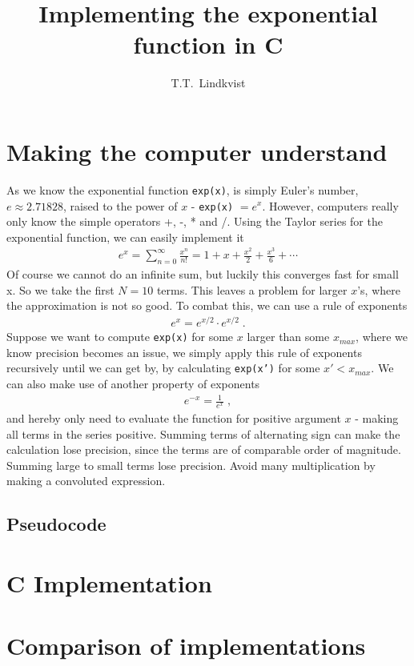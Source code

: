 \documentclass{article}
\title{Implementing the exponential function in C}
\author{T.T.~Lindkvist}
\date{}
\begin{document}
    \maketitle
    \section{Making the computer understand}
    As we know the exponential function \texttt{exp(x)}, is simply Euler's number, $e\approx2.71828$, raised to the power of $x$ - \texttt{exp(x)} $=e^x$. However, computers really only know the simple operators +, -, * and /. Using the Taylor series for the exponential function, we can easily implement it
    \begin{align}
        e^x = \sum_{n=0}^{\infty} \frac{x^n}{n!} = 1 + x + \frac{x^2}{2} + \frac{x^3}{6} + \cdots
    \end{align}
	Of course we cannot do an infinite sum, but luckily this converges fast for small x. So we take the first $N=10$ terms. This leaves a problem for larger $x$'s, where the approximation is not so good. To combat this, we can use a rule of exponents
	\begin{align}
		e^x = e^{x/2}\cdot e^{x/2} \;.
	\end{align}
	Suppose we want to compute \texttt{exp(x)} for some $x$ larger than some $x_{max}$, where we know precision becomes an issue, we simply apply this rule of exponents recursively until we can get by, by calculating \texttt{exp(x')} for some $x'<x_{max}$.
	We can also make use of another property of exponents
	\begin{align}
		e^{-x} = \frac{1}{e^x} \;,
	\end{align}
	and hereby only need to evaluate the function for positive argument $x$ - making all terms in the series positive. Summing terms of alternating sign can make the calculation lose precision, since the terms are of comparable order of magnitude.
	Summing large to small terms lose precision. Avoid many multiplication by making a convoluted expression.
\subsection{Pseudocode}
		
	
\section{C Implementation}

\section{Comparison of implementations}
\end{document}
